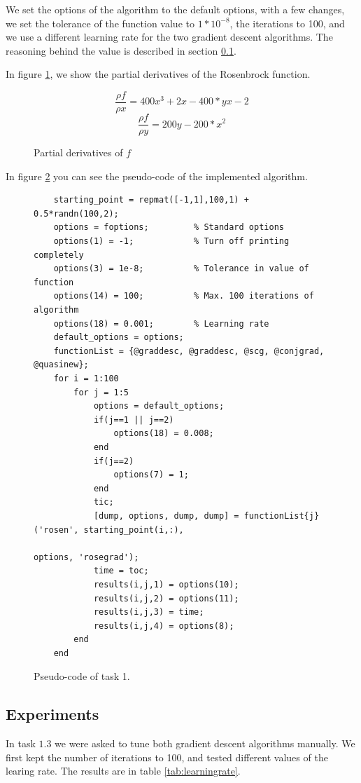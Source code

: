 \documentclass{article}
\begin{document}
We set the options of the algorithm to the default options, with a few changes, we set the tolerance of the function value to $1*10^{-8}$, the iterations to 100, and we use a different learning rate for the two gradient descent algorithms. The reasoning behind the value is described in section \ref{sec:experiments}.

In figure \ref{fig:partdiv}, we show the partial derivatives of the Rosenbrock function.
\begin{figure}[H]
    \[\frac{\rho f}{\rho x} = 400x^3 + 2x - 400*yx - 2\]
    \[\frac{\rho f}{\rho y} = 200y - 200*x^2\]
    \caption{Partial derivatives of $f$}
    \label{fig:partdiv}
\end{figure}

\newpage
In figure \ref{fig:pseudocode} you can see the pseudo-code of the implemented algorithm.

\begin{figure}[H]
\begin{verbatim}
    starting_point = repmat([-1,1],100,1) + 0.5*randn(100,2);
    options = foptions;         % Standard options
    options(1) = -1;            % Turn off printing completely
    options(3) = 1e-8;          % Tolerance in value of function
    options(14) = 100;          % Max. 100 iterations of algorithm
    options(18) = 0.001;        % Learning rate    
    default_options = options;		
    functionList = {@graddesc, @graddesc, @scg, @conjgrad, @quasinew};
    for i = 1:100
        for j = 1:5
            options = default_options;
            if(j==1 || j==2)
                options(18) = 0.008;
            end
            if(j==2)
                options(7) = 1;
            end
            tic;
            [dump, options, dump, dump] = functionList{j}('rosen', starting_point(i,:),
                                                                        options, 'rosegrad');
            time = toc;
            results(i,j,1) = options(10);
            results(i,j,2) = options(11);
            results(i,j,3) = time;
            results(i,j,4) = options(8);
        end 
    end  
\end{verbatim}
\caption{Pseudo-code of task 1.}
\label{fig:pseudocode}
\end{figure}

\subsection{Experiments}
\label{sec:experiments}
In task $1.3$ we were asked to tune both gradient descent algorithms manually. We first kept the number of iterations to 100, and tested different values of the learing rate. The results are in table \ref{tab:learningrate}.
\end{document}
